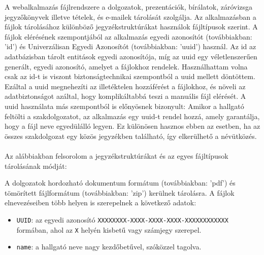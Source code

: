 


A webalkalmazás fájlrendszere a dolgozatok, prezentációk, bírálatok, záróvizsga jegyzőkönyvek illetve tételek, és e-mailek tárolását szolgálja. Az alkalmazásban a fájlok tárolásához különböző jegyzékstruktúrákat használok  fájltípusok szerint. A fájlok elérésének szempontjából az alkalmazás egyedi azonosítót (továbbiakban: 'id') és Univerzálisan Egyedi Azonosítót (továbbiakban: 'uuid') használ. Az id az adatbázisban tárolt entitások egyedi azonosítója, míg az uuid egy véletlenszerűen generált, egyedi azonosító, amelyet a fájlokhoz rendelek. Használhattam volna csak az id-t is viszont biztonságtechnikai szempontból a uuid mellett döntöttem. Ezáltal a uuid megnehezíti az illetéktelen hozzáférést a fájlokhoz, és növeli az adatbiztonságot azáltal, hogy komplikáltabbá teszi a manuális fájl elérését. A uuid használata más szempontból is előnyösnek bizonyult: Amikor a hallgató feltölti a szakdolgozatot, az alkalmazás egy uuid-t rendel hozzá, amely garantálja, hogy a fájl neve egyedülálló legyen. Ez különösen hasznos ebben az esetben, ha az összes szakdolgozat egy közös jegyzékben található, így elkerülhető a névütközés.\\
\\
Az alábbiakban felsorolom a jegyzékstruktúrákat és az egyes fájltípusok tárolásának módját:

A dolgozatok hordozható dokumentum formátum (továbbiakban: 'pdf') és tömörített fájlformátum (továbbiakban: 'zip') kerülnek tárolásra. A fájlok elnevezéseiben több helyen is szerepelnek a következő adatok:

\begin{itemize}
\item \texttt{UUID}: az egyedi azonosító \texttt{XXXXXXXX-XXXX-XXXX-XXXX-XXXXXXXXXXXX} formában, ahol az \texttt{X} helyén kisbetű vagy számjegy szerepel.

\item \texttt{name}: a hallgató neve nagy kezdőbetűvel, szóközzel tagolva.
\end{itemize}

